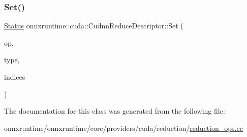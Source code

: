 \mbox{\label{classonnxruntime_1_1cuda_1_1CudnnReduceDescriptor_a56b9645be4f70f4dd39fe3d8e6a1c337}} 
\subsubsection{\texorpdfstring{Set()}{Set()}}
{\footnotesize\ttfamily \mbox{\hyperlink{classonnxruntime_1_1common_1_1Status}{Status}} onnxruntime\+::cuda\+::\+Cudnn\+Reduce\+Descriptor\+::\+Set (\begin{DoxyParamCaption}\item[{cudnn\+Reduce\+Tensor\+Op\+\_\+t}]{op,  }\item[{cudnn\+Data\+Type\+\_\+t}]{type,  }\item[{cudnn\+Reduce\+Tensor\+Indices\+\_\+t}]{indices }\end{DoxyParamCaption})\hspace{0.3cm}{\ttfamily [inline]}}



The documentation for this class was generated from the following file\+:\begin{DoxyCompactItemize}
\item 
onnxruntime/onnxruntime/core/providers/cuda/reduction/\mbox{\hyperlink{cuda_2reduction_2reduction__ops_8cc}{reduction\+\_\+ops.\+cc}}\end{DoxyCompactItemize}
